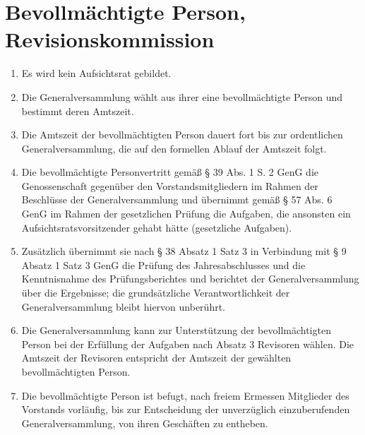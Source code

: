 \documentclass[a4paper, 12pt]{scrartcl}
\begin{document}
\section{Bevollmächtigte Person, Revisionskommission}
\begin{enumerate}
  \item Es wird kein Aufsichtsrat gebildet.
  \item Die Generalversammlung wählt aus ihrer eine bevollmächtigte Person und bestimmt deren Amtszeit.
  \item Die Amtszeit der bevollmächtigten Person dauert fort bis zur ordentlichen Generalversammlung, die auf den formellen Ablauf der Amtszeit folgt.
  \item Die bevollmächtigte Personvertritt gemäß § 39 Abs. 1 S. 2 GenG die Genossenschaft gegenüber den Vorstandsmitgliedern im Rahmen der Beschlüsse der Generalversammlung und übernimmt gemäß § 57 Abs. 6 GenG im Rahmen der gesetzlichen Prüfung die Aufgaben, die ansonsten ein Aufsichtsratsvorsitzender gehabt hätte (gesetzliche Aufgaben).
  \item Zusätzlich übernimmt sie nach § 38 Absatz 1 Satz 3 in Verbindung mit § 9 Absatz 1 Satz 3 GenG die Prüfung des Jahresabschlusses und die Kenntnisnahme des Prüfungsberichtes und berichtet der Generalversammlung über die Ergebnisse; die grundsätzliche Verantwortlichkeit der Generalversammlung bleibt hiervon unberührt.
  \item Die Generalversammlung kann zur Unterstützung der bevollmächtigten Person bei der Erfüllung der Aufgaben nach Absatz 3 Revisoren wählen. Die Amtszeit der Revisoren entspricht der Amtszeit der gewählten bevollmächtigten Person.
  \item Die bevollmächtigte Person ist befugt, nach freiem Ermessen Mitglieder des Vorstands vorläufig, bis zur Entscheidung der unverzüglich einzuberufenden Generalversammlung, von ihren Geschäften zu entheben.
\end{enumerate}
\end{document}
